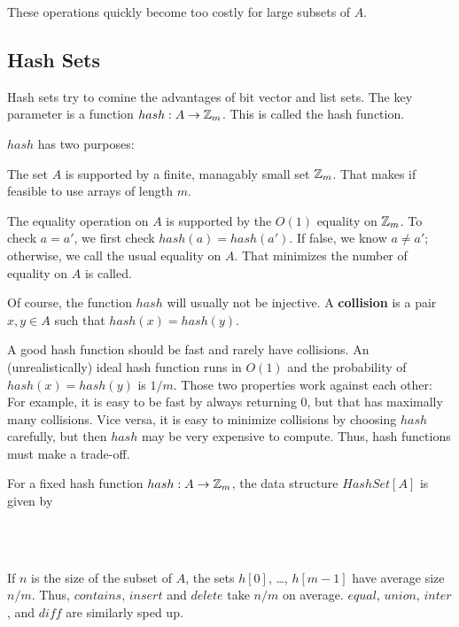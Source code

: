 These operations quickly become too costly for large subsets of $A$.

\subsection{Hash Sets}\label{sec:ad:hashset}

Hash sets try to comine the advantages of bit vector and list sets.
The key parameter is a function $hash:A\to \mathbb{Z}_m$.
This is called the hash function.

$hash$ has two purposes:
\begin{compactitem}
 \item The set $A$ is supported by a finite, managably small set $\mathbb{Z}_m$.
   That makes if feasible to use arrays of length $m$.
 \item The equality operation on $A$ is supported by the $O(1)$ equality on $\mathbb{Z}_m$.
   To check $a=a'$, we first check $hash(a)=hash(a')$.
   If false, we know $a\neq a'$; otherwise, we call the usual equality on $A$.
   That minimizes the number of equality on $A$ is called.
\end{compactitem}

Of course, the function $hash$ will usually not be injective.
A \textbf{collision} is a pair $x,y\in A$ such that $hash(x)=hash(y)$.

A good hash function should be fast and rarely have collisions.
An (unrealistically) ideal hash function runs in $O(1)$ and the probability of $hash(x)=hash(y)$ is $1/m$.
Those two properties work against each other: For example, it is easy to be fast by always returning $0$, but that has maximally many collisions.
Vice versa, it is easy to minimize collisions by choosing $hash$ carefully, but then $hash$ may be very expensive to compute.
Thus, hash functions must make a trade-off.

For a fixed hash function $hash:A\to \mathbb{Z}_m$, the data structure $HashSet[A]$ is given by
\begin{acode}
\\
\\
\end{acode}
\medskip

If $n$ is the size of the subset of $A$, the sets $h[0]$, \ldots, $h[m-1]$ have average size $n/m$.
Thus, $contains$, $insert$ and $delete$ take $n/m$ on average.
$equal$, $union$, $inter$, and $diff$ are similarly sped up.
\medskip

